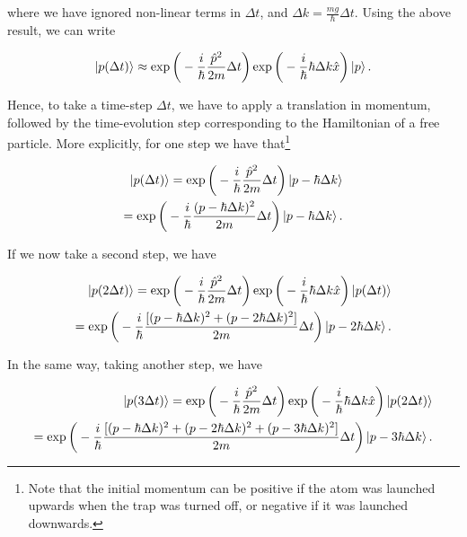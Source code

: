 \documentclass{article}
\begin{document}
where we have ignored non-linear terms in $\Delta t$, and $\Delta k = \frac{mg}{\hbar} \Delta t$. Using the above result, we can write

\begin{equation}
    \ket{p(\Delta t)} \approx \exp \bigg( -\frac{i}{\hbar} \frac{\hat{p}^{2}}{2m} \Delta t \bigg) \exp \bigg(- \frac{i}{\hbar} \hbar \Delta k \hat{x} \bigg) \ket{p}.
\end{equation}

Hence, to take a time-step $\Delta t$, we have to apply a translation in momentum, followed by the time-evolution step corresponding to the Hamiltonian of a free particle. More explicitly, for one step we have that\footnote{Note that the initial momentum can be positive if the atom was launched upwards when the trap was turned off, or negative if it was launched downwards.}

\begin{equation}
    \begin{split}
        \ket{p(\Delta t)} = \exp \bigg( -\frac{i}{\hbar} \frac{\hat{p}^{2}}{2m} \Delta t \bigg) \ket{p-\hbar \Delta k} \\ = \exp \bigg( -\frac{i}{\hbar} \frac{(p-\hbar \Delta k)^{2}}{2m} \Delta t \bigg)\ket{p-\hbar \Delta k}.
    \end{split}
\end{equation}

If we now take a second step, we have

\begin{equation}
    \begin{split}
        \ket{p(2\Delta t)} = \exp \bigg( -\frac{i}{\hbar} \frac{\hat{p}^{2}}{2m} \Delta t \bigg) \exp \bigg(- \frac{i}{\hbar} \hbar \Delta k \hat{x} \bigg) \ket{p(\Delta t)} \\ = \exp \bigg( -\frac{i}{\hbar} \frac{[(p-\hbar \Delta k)^{2}+(p-2\hbar \Delta k)^{2}]}{2m} \Delta t \bigg) \ket{p - 2 \hbar \Delta k}.
    \end{split}
\end{equation}

In the same way, taking another step, we have

\begin{equation}
    \begin{split}
        \ket{p(3\Delta t)} = \exp \bigg( -\frac{i}{\hbar} \frac{\hat{p}^{2}}{2m} \Delta t \bigg) \exp \bigg(- \frac{i}{\hbar} \hbar \Delta k \hat{x} \bigg) \ket{p(2\Delta t)} \\ = \exp \bigg( -\frac{i}{\hbar} \frac{[(p-\hbar \Delta k)^{2}+(p-2\hbar \Delta k)^{2} + (p-3\hbar \Delta k)^{2}]}{2m} \Delta t \bigg) \ket{p - 3 \hbar \Delta k}.
    \end{split}
\end{equation}
\end{document}
